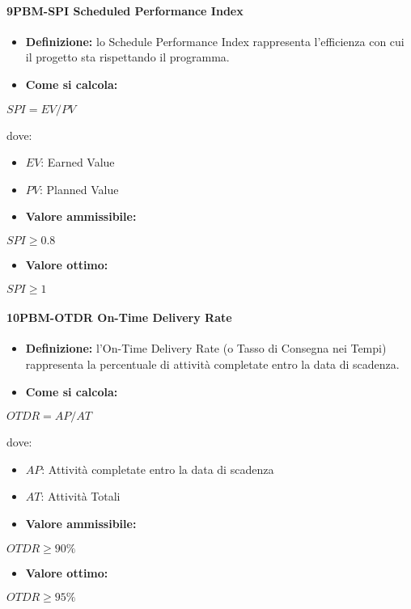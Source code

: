 \paragraph*{9PBM-SPI Scheduled Performance Index}
\begin{itemize}
    \item \textbf{Definizione:} lo Schedule Performance Index rappresenta l’efficienza con cui il progetto sta rispettando il programma.
    \item \textbf{Come si calcola:}
\end{itemize}
\begin{center}
   $SPI = EV/PV$ 
\end{center}
dove:
\begin{itemize}[label=$\rightarrow$]
    \item $EV$: Earned Value
    \item $PV$: Planned Value
\end{itemize}
\begin{itemize}
    \item \textbf{Valore ammissibile:}
\end{itemize}
\begin{center}
    $SPI \geq 0.8$
\end{center}
\begin{itemize}
    \item \textbf{Valore ottimo:}
\end{itemize}
\begin{center}
    $SPI \geq 1$
\end{center}

\paragraph*{10PBM-OTDR On-Time Delivery Rate}
\begin{itemize}
    \item \textbf{Definizione:} l’On-Time Delivery Rate (o Tasso di Consegna nei Tempi) rappresenta la percentuale di attività completate entro la data di scadenza.
    \item \textbf{Come si calcola:}
\end{itemize}
\begin{center}
   $OTDR = AP/AT$ 
\end{center}
dove:
\begin{itemize}[label=$\rightarrow$]
    \item $AP$: Attività completate entro la data di scadenza
    \item $AT$: Attività Totali
\end{itemize}
\begin{itemize}
    \item \textbf{Valore ammissibile:}
\end{itemize}
\begin{center}
    $OTDR \geq 90\%$
\end{center}
\begin{itemize}
    \item \textbf{Valore ottimo:}
\end{itemize}
\begin{center}
    $OTDR \geq 95\%$
\end{center}

